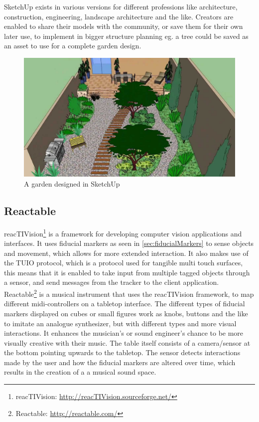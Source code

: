 			SketchUp exists in various versions for different professions like architecture, construction, engineering, landscape architecture and the like. Creators are enabled to share their models with the community, or save them for their own later use, to implement in bigger structure planning eg. a tree could be saved as an asset to use for a complete garden design.
			
			\begin{figure}[H]
				\centering
				\includegraphics[width=0.6\linewidth]{figure/Analysis/sketchupgarden}
				\caption{A garden designed in SketchUp}
				\label{fig:sketchupgarden}
			\end{figure}


		\subsection{Reactable}
			reacTIVision\footnote{reacTIVision: \url{http://reacTIVision.sourceforge.net/}} is a framework for developing computer vision applications and interfaces. It uses fiducial markers as seen in  \autoref{sec:fiducialMarkers} to sense objects and movement, which allows for more extended interaction. It also makes use of the TUIO protocol, which is a protocol used for tangible multi touch surfaces, this means that it is enabled to take input from multiple tagged objects through a sensor, and send messages from the tracker to the client application. \\
			
			Reactable\footnote{Reactable: \url{http://reactable.com/}} is a musical instrument that uses the reacTIVision framework, to map different midi-controllers on a tabletop interface. The different types of fiducial markers displayed on cubes or small figures work as knobs, buttons and the like to imitate an analogue synthesizer, but with different types and more visual interactions. It enhances the musician's or sound engineer's chance to be more visually creative with their music. The table itself consists of a camera/sensor at the bottom pointing upwards to the tabletop. The sensor detects interactions made by the user and how the fiducial markers are altered over time, which results in the creation of a a musical sound space.
				
